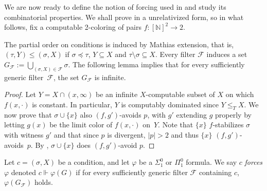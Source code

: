 \documentclass{article}
\def\F{\mathcal{F}}
\newcommand{\NN}[0]{\mathbb{N}}
\def\NN{\mathbb{N}}
\def\F{\mathcal{F}}
\numberwithin{theorem}{section}
\newtheorem{lemma}[theorem]{Lemma}
\theoremstyle{definition}
\newtheorem{definition}[theorem]{Definition}
\begin{document}
We are now ready to define the notion of forcing used in  and study its combinatorial properties. We shall prove  in a unrelativized form, so in what follows, fix a computable 2-coloring of pairs $f :[ \NN]^2 \to 2$.


The partial order on conditions is induced by Mathias extension, that is, $(\tau,Y) \leq (\sigma,X)$ if $\sigma \preceq \tau$, $Y \subseteq X$ and $\tau \setminus \sigma \subseteq X$.
Every filter $\F$ induces a set $G_\F := \bigcup_{(\sigma,X) \in \F} \sigma$. The following lemma implies that for every sufficiently generic filter~$\F$, the set $G_\F$ is infinite.


\begin{proof}
    Let $Y =  X \cap (x, \infty)$ be an infinite $X$-computable subset of $X$ on which $f(x, \cdot)$ is constant. In particular, $Y$ is computably dominated since $Y \leq_T X$. We now prove that $\sigma \cup \{ x \}$ also $(f,g')$-avoids $p$, with $g'$ extending $g$ properly by letting $g(x)$ be the limit color of $f(x, \cdot)$ on~$Y$. Note that $\{ x \}$ $f$-stabilizes $\sigma$ with witness $g'$ and that since $p$ is divergent, $|p|>2$ and thus $\{x\}$ $(f,g')$-avoids~$p$. By , $\sigma \cup \{ x \}$ does $(f,g')$-avoid $p$.
\end{proof}


Let $c = (\sigma,X)$ be a condition, and let $\varphi$ be a $\Sigma_1^0$ or $\Pi_1^0$ formula. We say $c$ \emph{forces} $\varphi$ denoted $c \Vdash \varphi(G)$ if for every sufficiently generic filter $\F$ containing $c$, $\varphi(G_\F)$ holds.
\end{document}
